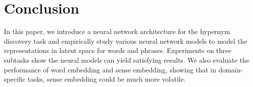 \documentclass[11pt,a4paper]{article}
\begin{document}
\section{Conclusion}

In this paper, we introduce a neural network architecture for the hypernym discovery task and empirically study various neural network models to model the representations in latent space for words and phrases. Experiments on three subtasks show the neural models can yield satisfying results. We also evaluate the performance of word embedding and sense embedding, showing that in domain-specific tasks, sense embedding could be much more volatile. 




\appendix
\end{document}
